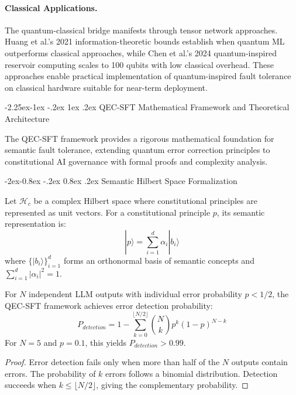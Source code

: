 \documentclass[manuscript,screen,9pt]{acmart}
\makeatletter
\renewcommand\subsection{\@startsection{subsection}{2}{\z@}%
  {-2.25ex\@plus -1ex \@minus -.2ex}%
  {1ex \@plus .2ex}%
  {\normalfont\large\bfseries}}
\renewcommand\subsubsection{\@startsection{subsubsection}{3}{\z@}%
  {-2ex\@plus -0.8ex \@minus -.2ex}%
  {0.8ex \@plus .2ex}%
  {\normalfont\normalsize\bfseries}}
\makeatother
\begin{document}
\begin{table}[!htb]
\paragraph{Classical Applications.} The quantum-classical bridge manifests through tensor network approaches. Huang et al.'s 2021 information-theoretic bounds \cite{Huang2021QuantumML} establish when quantum ML outperforms classical approaches, while Chen et al.'s 2024 quantum-inspired reservoir computing \cite{Chen2024QuantumReservoir} scales to 100 qubits with low classical overhead. These approaches enable practical implementation of quantum-inspired fault tolerance on classical hardware suitable for near-term deployment.

\subsection{QEC-SFT Mathematical Framework and Theoretical Architecture}
\label{subsec:qec_sft_architecture}

The QEC-SFT framework provides a rigorous mathematical foundation for semantic fault tolerance, extending quantum error correction principles to constitutional AI governance with formal proofs and complexity analysis.

\subsubsection{Semantic Hilbert Space Formalization}

\begin{definition}
Let $\mathcal{H}_c$ be a complex Hilbert space where constitutional principles are represented as unit vectors. For a constitutional principle $p$, its semantic representation is:
$$|p\rangle = \sum_{i=1}^{d} \alpha_i |b_i\rangle$$
where $\{|b_i\rangle\}_{i=1}^d$ forms an orthonormal basis of semantic concepts and $\sum_{i=1}^d |\alpha_i|^2 = 1$.
\end{definition}

\begin{theorem}
For $N$ independent LLM outputs with individual error probability $p < 1/2$, the QEC-SFT framework achieves error detection probability:
$$P_{detection} = 1 - \sum_{k=0}^{\lfloor N/2 \rfloor} \binom{N}{k} p^k (1-p)^{N-k}$$
For $N = 5$ and $p = 0.1$, this yields $P_{detection} > 0.99$.
\end{theorem}

\begin{proof}
Error detection fails only when more than half of the $N$ outputs contain errors. The probability of $k$ errors follows a binomial distribution. Detection succeeds when $k \leq \lfloor N/2 \rfloor$, giving the complementary probability.
\end{proof}


\end{table}
\end{document}
